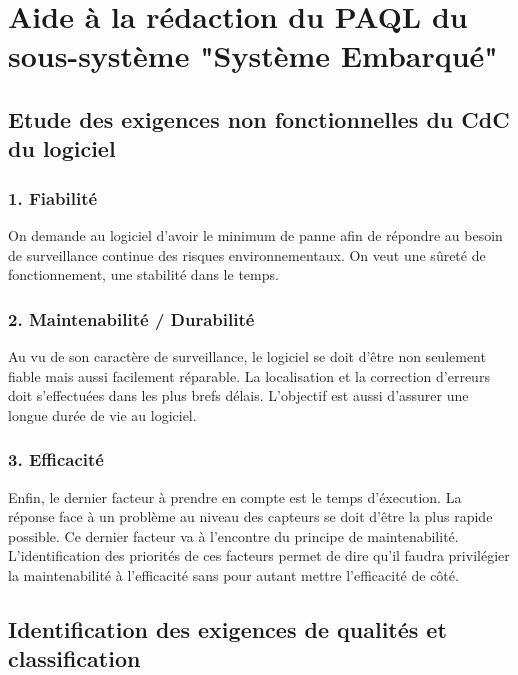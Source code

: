 \section{Aide à la rédaction du PAQL du sous-système "Système Embarqué"}

\subsection{Etude des exigences non fonctionnelles du CdC du logiciel}

\subsubsection*{1. Fiabilité} 
On demande au logiciel d'avoir le minimum de panne afin de répondre au besoin de surveillance continue des risques environnementaux. On veut une sûreté de fonctionnement, une stabilité dans le temps.

\subsubsection*{2. Maintenabilité / Durabilité}
Au vu de son caractère de surveillance, le logiciel se doit d'être non seulement fiable mais aussi facilement réparable. La localisation et la correction d'erreurs doit s'effectuées dans les plus brefs délais. L'objectif est aussi d'assurer une longue durée de vie au logiciel.

\subsubsection*{3. Efficacité} 
Enfin, le dernier facteur à prendre en compte est le temps d'éxecution. La réponse face à un problème au niveau des capteurs se doit d'être la plus rapide possible.
Ce dernier facteur va à l'encontre du principe de maintenabilité. L'identification des priorités de ces facteurs permet de dire qu'il faudra privilégier la maintenabilité à l'efficacité sans pour autant mettre l'efficacité de côté.


\subsection{Identification des exigences de qualités et classification}